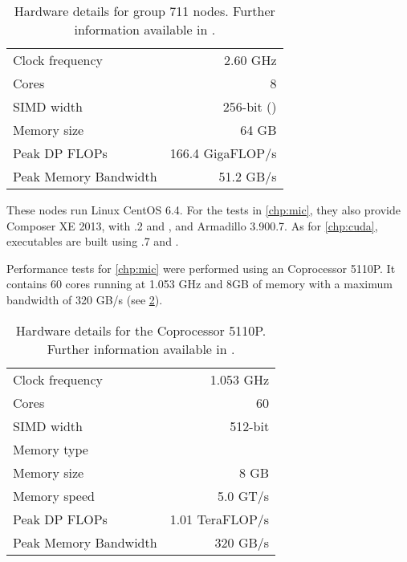 \documentclass[../thesis]{subfiles}
\begin{document}
	\begin{table}[p]
		\begin{center}
			\begin{tabular}{lr}
				\hline
				Clock frequency & 2.60 GHz \\
				Cores & 8 \\
				SIMD width & 256-bit (\avx) \\
				Memory size & 64 GB \\
				\hline
				Peak DP FLOPs & 166.4 GigaFLOP/s \\
				Peak Memory Bandwidth & 51.2 GB/s \\ 
				\hline
			\end{tabular}
		\end{center}
		\caption{Hardware details for \search group 711 nodes. Further information available in \cite{Intel:Xeon:e5_2670,Intel:Xeon:e5_2600}.}
		\label{tab:search:711}
	\end{table}

	These nodes run Linux CentOS 6.4. For the tests in \cref{chp:mic}, they also provide \intel Composer XE 2013, with .2 and \mkl, and Armadillo 3.900.7. As for \cref{chp:cuda}, executables are built using .7 and .

	Performance tests for \cref{chp:mic} were performed using an \intel\xeonphi Coprocessor 5110P. It contains 60 cores running at 1.053 GHz and 8GB of  memory with a maximum bandwidth of 320 GB/s (see \cref{tab:5110p}).

	\begin{table}[p]
		\begin{center}
			\begin{tabular}{lr}
				\hline
				Clock frequency & 1.053 GHz \\
				Cores & 60 \\
				SIMD width & 512-bit \\
				Memory type & \gddr5 \\
				Memory size & 8 GB \\
				Memory speed & 5.0 GT/s \\
				\hline
				Peak DP FLOPs & 1.01 TeraFLOP/s \\
				Peak Memory Bandwidth & 320 GB/s \\ 
				\hline
			\end{tabular}
		\end{center}
		\caption{Hardware details for the \intel\xeonphi Coprocessor 5110P. Further information available in \cite{Intel:XeonPhi:5110P}.}
		\label{tab:5110p}
	\end{table}
\end{document}
